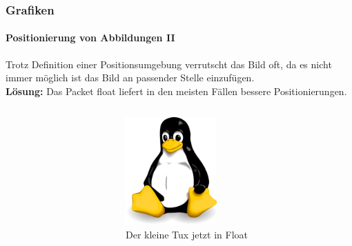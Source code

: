 
\begin{frame}[t]
\medskip
\frametitle{Grafiken}
\framesubtitle{Positionierung von Abbildungen II }
Trotz Definition einer Positionsumgebung verrutscht das Bild oft, da es nicht immer m\"oglich ist das Bild an passender Stelle einzufügen.\\
\textbf{L\"osung:} Das Packet {\ttfamily float} liefert in den meisten F\"allen bessere Positionierungen.

\begin{columns}
\begin{column}{.5\textwidth}
{\ttfamily {\footnotesize
}}
\end{column}

\begin{column}{.5\textwidth} 
\begin{figure}
\begin{center}
    \includegraphics[width=35mm]{image/tux.png}
\caption{Der kleine Tux jetzt in Float}
\label{img:kleinertux_float}
\end{center}
\end{figure}
\end{column}
\end{columns}

\end{frame}
